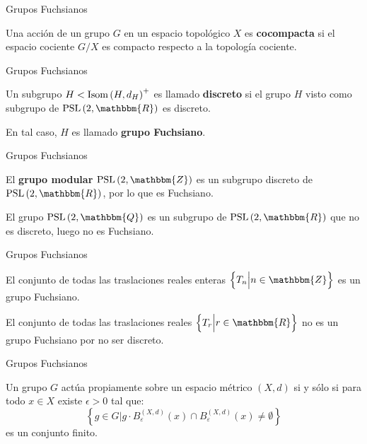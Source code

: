 \documentclass[xcolor=dvipsnames]{beamer}
\theoremstyle{largebreak}
\newcommand{\bbm}[1]{\ensuremath{\mathbbm{#1}}}
\newcommand{\Isom}[1]{\ensuremath{\textup{Isom}\left(#1\right)}}
\newcommand{\PSL}[1]{\ensuremath{\textup{PSL}\left(#1\right)}}
\begin{document}
\begin{frame}{Grupos Fuchsianos}
    \begin{mydef}
        Una acción de un grupo $G$ en un espacio topológico $X$ es \textbf{cocompacta} si el espacio cociente $G/X$ es compacto respecto a la topología cociente.
    \end{mydef}
\end{frame}

\begin{frame}{Grupos Fuchsianos}
    \begin{mydef}
        Un subgrupo $H<\Isom{H,d_H}^+$ es llamado \textbf{discreto} si el grupo $H$ visto como subgrupo de $\PSL{2,\bbm{R}}$ es discreto.
        
        En tal caso, $H$ es llamado \textbf{grupo Fuchsiano}.
    \end{mydef}
\end{frame}

\begin{frame}{Grupos Fuchsianos}
    \begin{exa}
        El \textbf{grupo modular} $\PSL{2,\bbm{Z}}$ es un subgrupo discreto de $\PSL{2,\bbm{R}}$, por lo que es Fuchsiano.
    \end{exa}

    \begin{exa}
        El grupo $\PSL{2,\bbm{Q}}$ es un subgrupo de $\PSL{2,\bbm{R}}$ que no es discreto, luego no es Fuchsiano.
    \end{exa}
\end{frame}

\begin{frame}{Grupos Fuchsianos}
    \begin{exa}
        El conjunto de todas las traslaciones reales enteras $\left\{T_n\Big|n\in\bbm{Z} \right\}$ es un grupo Fuchsiano.
    \end{exa}

    \begin{exa}
        El conjunto de todas las traslaciones reales $\left\{T_r\Big|r\in\bbm{R} \right\}$ no es un grupo Fuchsiano por no ser discreto.
    \end{exa}
\end{frame}

\begin{frame}{Grupos Fuchsianos}
    \begin{theor}
        Un grupo $G$ actúa propiamente sobre un espacio métrico $(X,d)$ si y sólo si para todo $x\in X$ existe $\epsilon>0$ tal que:
        \begin{equation*}
            \left\{g\in G\Big|g\cdot B_\varepsilon^{(X,d)}(x)\cap B_\varepsilon^{(X,d)}(x)\neq\emptyset \right\}
        \end{equation*}
        es un conjunto finito.
    \end{theor}
\end{frame}
\end{document}
